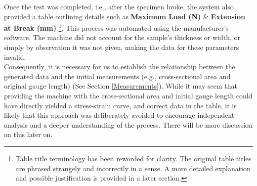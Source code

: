 \documentclass{article}
\begin{document}
Once the test was completed, i.e., after the specimen broke, the system also provided a table outlining details such as \textbf{Maximum Load (N)} \& \textbf{Extension at Break (mm)} \footnote{Table title terminology has been reworded for clarity. The original table titles are phrased strangely and incorrectly in a sense. A more detailed explanation and possible justification is provided in a later section.}. This process was automated using the manufacturer's software. The machine did not account for the sample's thickness or width, or simply by observation it was not given, making the data for these parameters invalid.\\[8pt]
Consequently, it is necessary for us to establish the relationship between the generated data and the initial measurements (e.g., cross-sectional area and original gauge length) (See Section \ref{Measurements}). While it may seem that providing the machine with the cross-sectional area and initial gauge length could have directly yielded a stress-strain curve, and correct data in the table, it is likely that this approach was deliberately avoided to encourage independent analysis and a deeper understanding of the process. There will be more discussion on this later on.
\end{document}
